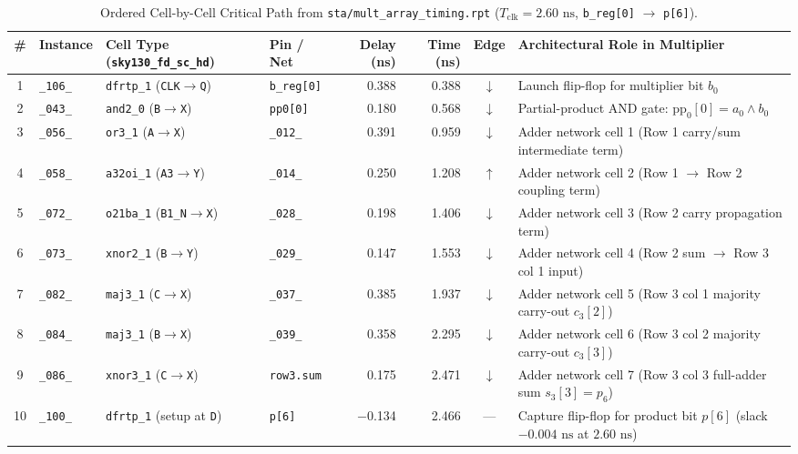 \documentclass[conference,10pt]{IEEEtran}
\begin{document}
\begin{table}[!t]
    \centering
    \caption{Ordered Cell-by-Cell Critical Path from \texttt{sta/mult\_array\_timing.rpt} ($T_{\text{clk}} = 2.60\text{ ns}$, \texttt{b\_reg[0]} $\rightarrow$ \texttt{p[6]}).}
    \label{tab:partC_path}
    \footnotesize
    \begin{tabularx}{\textwidth}{@{}c l l l r r c X@{}}
        \toprule
        \textbf{\#} & \textbf{Instance} & \textbf{Cell Type (\texttt{sky130\_fd\_sc\_hd})} & \textbf{Pin / Net} & \textbf{Delay (ns)} & \textbf{Time (ns)} & \textbf{Edge} & \textbf{Architectural Role in Multiplier} \\
        \midrule
        1 & \texttt{\_106\_} & \texttt{dfrtp\_1} (\texttt{CLK}$\rightarrow$\texttt{Q}) & \texttt{b\_reg[0]} & 0.388 & 0.388 & $\downarrow$ & Launch flip-flop for multiplier bit $b_0$ \\
        2 & \texttt{\_043\_} & \texttt{and2\_0} (\texttt{B}$\rightarrow$\texttt{X}) & \texttt{pp0[0]} & 0.180 & 0.568 & $\downarrow$ & Partial-product AND gate: $\text{pp}_0[0] = a_0 \wedge b_0$ \\
        3 & \texttt{\_056\_} & \texttt{or3\_1} (\texttt{A}$\rightarrow$\texttt{X}) & \texttt{\_012\_} & 0.391 & 0.959 & $\downarrow$ & Adder network cell 1 (Row 1 carry/sum intermediate term) \\
        4 & \texttt{\_058\_} & \texttt{a32oi\_1} (\texttt{A3}$\rightarrow$\texttt{Y}) & \texttt{\_014\_} & 0.250 & 1.208 & $\uparrow$ & Adder network cell 2 (Row 1 $\rightarrow$ Row 2 coupling term) \\
        5 & \texttt{\_072\_} & \texttt{o21ba\_1} (\texttt{B1\_N}$\rightarrow$\texttt{X}) & \texttt{\_028\_} & 0.198 & 1.406 & $\downarrow$ & Adder network cell 3 (Row 2 carry propagation term) \\
        6 & \texttt{\_073\_} & \texttt{xnor2\_1} (\texttt{B}$\rightarrow$\texttt{Y}) & \texttt{\_029\_} & 0.147 & 1.553 & $\downarrow$ & Adder network cell 4 (Row 2 sum $\rightarrow$ Row 3 col 1 input) \\
        7 & \texttt{\_082\_} & \texttt{maj3\_1} (\texttt{C}$\rightarrow$\texttt{X}) & \texttt{\_037\_} & 0.385 & 1.937 & $\downarrow$ & Adder network cell 5 (Row 3 col 1 majority carry-out $c_3[2]$) \\
        8 & \texttt{\_084\_} & \texttt{maj3\_1} (\texttt{B}$\rightarrow$\texttt{X}) & \texttt{\_039\_} & 0.358 & 2.295 & $\downarrow$ & Adder network cell 6 (Row 3 col 2 majority carry-out $c_3[3]$) \\
        9 & \texttt{\_086\_} & \texttt{xnor3\_1} (\texttt{C}$\rightarrow$\texttt{X}) & \texttt{row3.sum} & 0.175 & 2.471 & $\downarrow$ & Adder network cell 7 (Row 3 col 3 full-adder sum $s_3[3]=p_6$) \\
        10 & \texttt{\_100\_} & \texttt{dfrtp\_1} (setup at \texttt{D}) & \texttt{p[6]} & $-$0.134 & 2.466 & --- & Capture flip-flop for product bit $p[6]$ (slack $-0.004\text{ ns}$ at $2.60\text{ ns}$) \\
        \bottomrule
    \end{tabularx}
\end{table}
\end{document}
